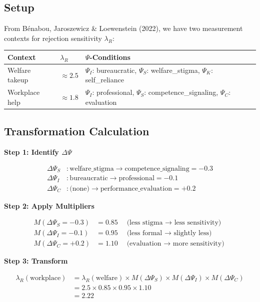 \subsection{Setup}

From Bénabou, Jaroszewicz \& Loewenstein (2022), we have two measurement contexts
for rejection sensitivity $\lambda_R$:

\begin{center}
\begin{tabular}{lll}
\toprule
\textbf{Context} & \textbf{$\lambda_R$} & \textbf{$\Psi$-Conditions} \\
\midrule
Welfare takeup & $\approx 2.5$ & $\Psi_I$: bureaucratic, $\Psi_S$: welfare\_stigma, $\Psi_K$: self\_reliance \\
Workplace help & $\approx 1.8$ & $\Psi_I$: professional, $\Psi_S$: competence\_signaling, $\Psi_C$: evaluation \\
\bottomrule
\end{tabular}
\end{center}

\subsection{Transformation Calculation}

\textbf{Step 1: Identify $\Delta\Psi$}

\begin{align*}
\Delta\Psi_S &: \text{welfare\_stigma} \to \text{competence\_signaling} = -0.3 \\
\Delta\Psi_I &: \text{bureaucratic} \to \text{professional} = -0.1 \\
\Delta\Psi_C &: \text{(none)} \to \text{performance\_evaluation} = +0.2
\end{align*}

\textbf{Step 2: Apply Multipliers}

\begin{align*}
M(\Delta\Psi_S = -0.3) &= 0.85 \quad \text{(less stigma $\to$ less sensitivity)} \\
M(\Delta\Psi_I = -0.1) &= 0.95 \quad \text{(less formal $\to$ slightly less)} \\
M(\Delta\Psi_C = +0.2) &= 1.10 \quad \text{(evaluation $\to$ more sensitivity)}
\end{align*}

\textbf{Step 3: Transform}

\begin{align*}
\lambda_R(\text{workplace}) &= \lambda_R(\text{welfare}) \times M(\Delta\Psi_S) \times M(\Delta\Psi_I) \times M(\Delta\Psi_C) \\
&= 2.5 \times 0.85 \times 0.95 \times 1.10 \\
&= 2.22
\end{align*}

